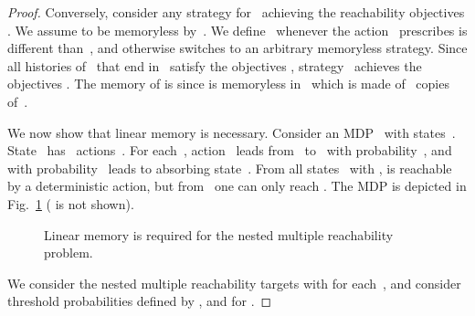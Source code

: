 \documentclass{llncs}
\begin{document}
\begin{proof}
  Conversely, consider any strategy  for~ achieving the reachability objectives .
  We assume  to be memoryless by~\cite{EKVY-lmcs08}.
  We define~ whenever the action~ prescribes is different than~, and otherwise
   switches to an arbitrary memoryless strategy. Since all histories of~ that end in~ satisfy the objectives
  , strategy~ achieves the objectives .
  The memory of  is  since  is memoryless in~ which is made of~ copies of~.

  We now show that linear memory is necessary.
  Consider an MDP~ with states~. State~ has~ actions~.
  For each~, action~ leads from~ to~ with probability~,
  and with probability~ leads to absorbing state~. From all states~ with ,  is reachable by a deterministic action,
  but from~ one can only reach .
  The MDP is depicted in Fig.~\ref{fig:nested} ( is not shown).

\vspace{-4mm}
\begin{figure}[h]
\begin{center}
  \caption{Linear memory is required for the nested multiple reachability problem.}
  \label{fig:nested}
\end{center}
\vspace{-6mm}
\end{figure}

We consider the nested multiple reachability targets 
with  for each~, and consider threshold probabilities
 defined by
, and 
for .


\end{proof}
\end{document}
